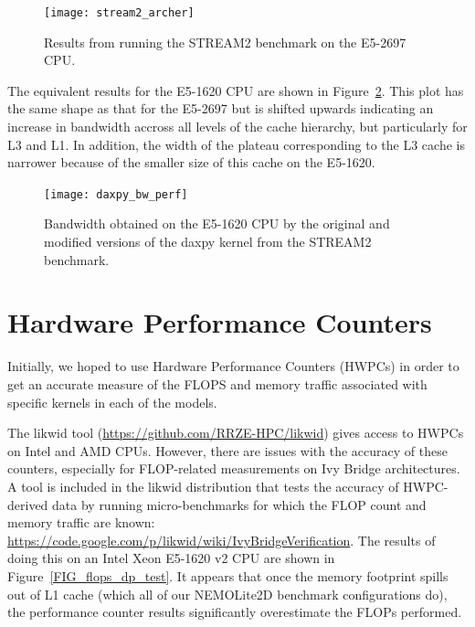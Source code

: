 \documentclass[12pt]{article}
\begin{document}
\begin{figure}
\texttt{[image: stream2\_archer]}
\caption{Results from running the STREAM2 benchmark on the E5-2697
  CPU.}
\label{FIG_stream2}
\end{figure}

 The equivalent results for the E5-1620 CPU are shown in
 Figure~\ref{FIG_daxpy_bw}. This plot has the same shape as that for
 the E5-2697 but is shifted upwards indicating an increase in
 bandwidth accross all levels of the cache hierarchy, but particularly
 for L3 and L1. In addition, the width of the plateau corresponding to
 the L3 cache is narrower because of the smaller size of this cache on
 the E5-1620.

\begin{figure}
\texttt{[image: daxpy\_bw\_perf]}
\caption{Bandwidth obtained on the E5-1620 CPU by the original and
  modified versions of the daxpy kernel from the STREAM2 benchmark.}
\label{FIG_daxpy_bw}
\end{figure}

\section{Hardware Performance Counters}

Initially, we hoped to use Hardware Performance Counters (HWPCs) in
order to get an accurate measure of the FLOPS and memory traffic
associated with specific kernels in each of the models.

The likwid tool (\url{https://github.com/RRZE-HPC/likwid}) gives
access to HWPCs on Intel and AMD CPUs.
However, there are issues with the accuracy of these counters,
especially for FLOP-related measurements on Ivy Bridge architectures. A
tool is included in the likwid distribution that tests the accuracy of
HWPC-derived data by running micro-benchmarks for which the FLOP count
and memory traffic are known:
\url{https://code.google.com/p/likwid/wiki/IvyBridgeVerification}.
The results of doing this on an Intel Xeon E5-1620 v2 CPU are shown in
Figure~\ref{FIG_flops_dp_test}. It appears that once the memory
footprint spills out of L1 cache (which all of our NEMOLite2D
benchmark configurations do), the performance counter results
significantly overestimate the FLOPs performed.
\end{document}
